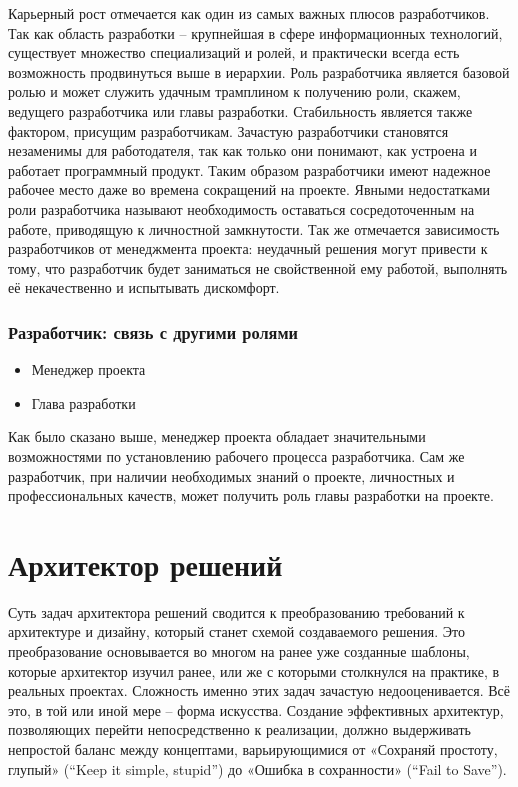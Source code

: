 \documentclass{../industrial-development}
\begin{document}
\lecturenotes

Карьерный рост отмечается как один из самых важных плюсов разработчиков. Так как область разработки – крупнейшая в сфере информационных технологий, существует множество специализаций и ролей, и практически всегда есть возможность продвинуться выше в иерархии. Роль разработчика является базовой ролью и может служить удачным трамплином к получению роли, скажем, ведущего разработчика или главы разработки.
Стабильность является также фактором, присущим разработчикам. Зачастую разработчики становятся незаменимы для работодателя, так как только они понимают, как устроена и работает программный продукт. Таким образом разработчики имеют надежное рабочее место даже во времена сокращений на проекте. 
Явными недостатками роли разработчика называют необходимость оставаться сосредоточенным на работе, приводящую к личностной замкнутости. Так же отмечается зависимость разработчиков от менеджмента проекта: неудачный решения могут привести к тому, что разработчик будет заниматься не свойственной ему работой, выполнять её некачественно и испытывать дискомфорт. 
  ~\cite{Anatomy}

\begin{frame} \frametitle{Разработчик: связь с другими ролями}
  \begin{itemize}
  \item Менеджер проекта
  \item Глава разработки
  \end{itemize}
\end{frame}
\lecturenotes
Как было сказано выше, менеджер проекта обладает значительными возможностями по установлению рабочего процесса разработчика. Сам же разработчик, при наличии необходимых знаний о проекте, личностных и профессиональных качеств, может получить роль главы разработки на проекте.  ~\cite{Anatomy}


\section{Архитектор решений }

\lecturenotes

Суть задач архитектора решений сводится к преобразованию требований к архитектуре и дизайну, который станет схемой создаваемого решения. Это преобразование основывается во многом на ранее уже созданные шаблоны, которые архитектор изучил ранее, или же с которыми столкнулся на практике, в реальных проектах. 
Сложность именно этих задач зачастую недооценивается. Всё это, в той или иной мере – форма искусства. Создание эффективных архитектур, позволяющих перейти непосредственно к реализации, должно выдерживать непростой баланс между концептами, варьирующимися от «Сохраняй простоту, глупый» (“Keep it simple, stupid”) до «Ошибка в сохранности» (“Fail to Save”).
   ~\cite{Anatomy}
\end{document}
